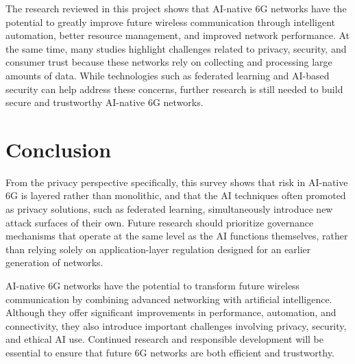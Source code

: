 \documentclass[letterpaper]{article}
\begin{document}
The research reviewed in this project shows that AI-native 6G networks have the potential to greatly improve future wireless communication through intelligent automation, better resource management, and improved network performance. At the same time, many studies highlight challenges related to privacy, security, and consumer trust because these networks rely on collecting and processing large amounts of data. While technologies such as federated learning and AI-based security can help address these concerns, further research is still needed to build secure and trustworthy AI-native 6G networks.

\section{Conclusion}
From the privacy perspective specifically, this survey shows that risk in AI-native 6G
is layered rather than monolithic, and that the AI techniques often promoted as privacy
solutions, such as federated learning, simultaneously introduce new attack surfaces of
their own. Future research should prioritize governance mechanisms that operate at the
same level as the AI functions themselves, rather than relying solely on
application-layer regulation designed for an earlier generation of networks.

AI-native 6G networks have the potential to transform future wireless communication by combining advanced networking with artificial intelligence. Although they offer significant improvements in performance, automation, and connectivity, they also introduce important challenges involving privacy, security, and ethical AI use. Continued research and responsible development will be essential to ensure that future 6G networks are both efficient and trustworthy.



\end{document}
